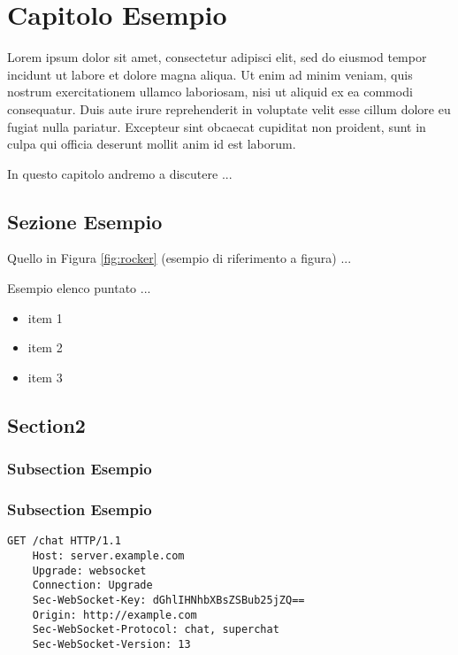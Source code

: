 \chapter{Capitolo Esempio}
\label{chap:CapitoloEsempio}

Lorem ipsum dolor sit amet, consectetur adipisci elit, sed do eiusmod tempor incidunt ut labore et dolore magna aliqua. Ut enim ad minim veniam, quis nostrum exercitationem ullamco laboriosam, nisi ut aliquid ex ea commodi consequatur. Duis aute irure reprehenderit in voluptate velit esse cillum dolore eu fugiat nulla pariatur. Excepteur sint obcaecat cupiditat non proident, sunt in culpa qui officia deserunt mollit anim id est laborum.

In questo capitolo andremo a discutere ...
  
\section{Sezione Esempio}
\label{sec:real-time}
Quello in Figura \ref{fig:rocker}  (esempio di riferimento a figura) ...


Esempio elenco puntato ...
\begin{itemize}
	\item item 1
	\item item 2
	\item item 3
\end{itemize}


\section{Section2}

\subsection{Subsection Esempio}
\label{sec:handshake}

\subsection{Subsection Esempio}
\label{sec:handshake}

\begin{lstlisting}[caption={Esempio di listing}, style=javaScriptCode]
	GET /chat HTTP/1.1
	Host: server.example.com
	Upgrade: websocket
	Connection: Upgrade
	Sec-WebSocket-Key: dGhlIHNhbXBsZSBub25jZQ==
	Origin: http://example.com
	Sec-WebSocket-Protocol: chat, superchat
	Sec-WebSocket-Version: 13
\end{lstlisting} 


